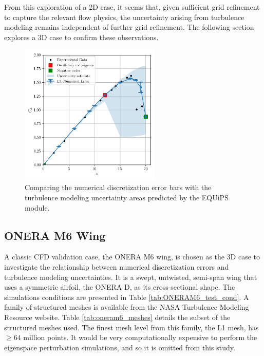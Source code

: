 From this exploration of a 2D case, it seems that, given sufficient grid refinement to capture the relevant flow physics, the uncertainty arising from turbulence modeling remains independent of further grid refinement. 
The following section explores a 3D case to confirm these observations.

\begin{figure}
\center
\includegraphics[width=0.6\textwidth]{code/image_gen/naca0012/images/naca0012_CL_vs_alpha_num_uq_L3.png}
\caption{Comparing the numerical discretization error bars with the turbulence modeling uncertainty areas predicted by the EQUiPS module. \label{fig:naca0012_num+turb_uq}}
\end{figure}

\subsection{ONERA M6 Wing}

A classic CFD validation case, the ONERA M6 wing, is chosen as the 3D case to investigate the relationship between numerical discretization errors and turbulence modeling uncertainties. 
It is a swept, untwisted, semi-span wing that uses a symmetric airfoil, the ONERA D, as its cross-sectional shape. 
The simulations conditions are presented in Table \ref{tab:ONERAM6_test_cond}.
A family of structured meshes is available from the NASA Turbulence Modeling Resource website.
Table \ref{tab:oneram6_meshes} details the subset of the structured meshes used.
The finest mesh level from this family, the L1 mesh, has $\ge 64$ million points. 
It would be very computationally expensive to perform the eigenspace perturbation simulations, and so it is omitted from this study.

